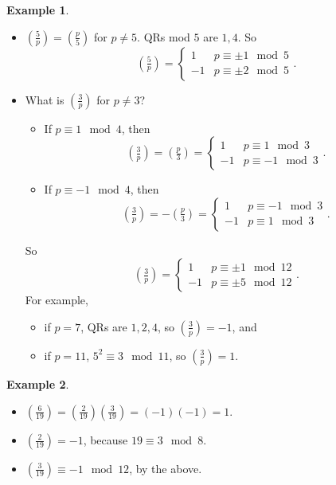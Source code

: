\documentclass{article}
\newcommand{\rb}[1]{\left( #1 \right)}
\newcommand{\legendre}[2]{\rb{\tfrac{#1}{#2}}}
\theoremstyle{definition}\newtheorem{definition}{Definition}
\theoremstyle{definition}\newtheorem{remark}[definition]{Remark}
\theoremstyle{definition}\newtheorem*{example}{Example}
\theoremstyle{definition}\newtheorem*{note}{Note}
\begin{document}
\begin{example}
\hfill
\begin{itemize}
\item $ \legendre{5}{p} = \legendre{p}{5} $ for $ p \ne 5 $. QRs mod $ 5 $ are $ 1, 4 $. So
$$ \legendre{5}{p} = \begin{cases}
1 & p \equiv \pm 1 \mod 5 \\
-1 & p \equiv \pm 2 \mod 5
\end{cases}. $$
\item What is $ \legendre{3}{p} $ for $ p \ne 3 $?
\begin{itemize}
\item If $ p \equiv 1 \mod 4 $, then
$$ \legendre{3}{p} = \legendre{p}{3} = \begin{cases}
1 & p \equiv 1 \mod 3 \\
-1 & p \equiv -1 \mod 3
\end{cases}. $$
\item If $ p \equiv -1 \mod 4 $, then
$$ \legendre{3}{p} = -\legendre{p}{3} = \begin{cases}
1 & p \equiv -1 \mod 3 \\
-1 & p \equiv 1 \mod 3
\end{cases}. $$
\end{itemize}
So
$$ \legendre{3}{p} = \begin{cases}
1 & p \equiv \pm 1 \mod 12 \\
-1 & p \equiv \pm 5 \mod 12
\end{cases}. $$
For example,
\begin{itemize}
\item if $ p = 7 $, QRs are $ 1, 2, 4 $, so $ \legendre{3}{p} = -1 $, and
\item if $ p = 11 $, $ 5^2 \equiv 3 \mod 11 $, so $ \legendre{3}{p} = 1 $.
\end{itemize}
\end{itemize}
\end{example}

\begin{example}
\hfill
\begin{itemize}
\item $ \legendre{6}{19} = \legendre{2}{19}\legendre{3}{19} = \rb{-1}\rb{-1} = 1 $.
\item $ \legendre{2}{19} = -1 $, because $ 19 \equiv 3 \mod 8 $.
\item $ \legendre{3}{19} \equiv -1 \mod 12 $, by the above.
\end{itemize}
\end{example}
\end{document}
